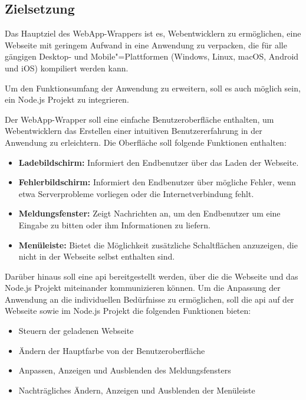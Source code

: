 \subsection{Zielsetzung}

Das Hauptziel des WebApp-Wrappers ist es, Webentwicklern zu ermöglichen, eine Webseite mit geringem Aufwand in eine Anwendung zu verpacken, die für alle gängigen Desktop- und Mobile"=Plattformen (Windows, Linux, macOS, Android und iOS) kompiliert werden kann.

Um den Funktionsumfang der Anwendung zu erweitern, soll es auch möglich sein, ein Node.js Projekt zu integrieren.

Der WebApp-Wrapper soll eine einfache Benutzeroberfläche enthalten, um Webentwicklern das Erstellen einer intuitiven Benutzererfahrung in der Anwendung zu erleichtern.
Die Oberfläche soll folgende Funktionen enthalten:

\begin{itemize}
  \setlength\itemsep{-0.5em}
  \item \textbf{Ladebildschirm:}
  Informiert den Endbenutzer über das Laden der Webseite.
  \item \textbf{Fehlerbildschirm:}
  Informiert den Endbenutzer über mögliche Fehler, wenn etwa Serverprobleme vorliegen oder die Internetverbindung fehlt.
  \item \textbf{Meldungsfenster:}
  Zeigt Nachrichten an, um den Endbenutzer um eine Eingabe zu bitten oder ihm Informationen zu liefern.
  \item \textbf{Menüleiste:}
  Bietet die Möglichkeit zusätzliche Schaltflächen anzuzeigen, die nicht in der Webseite selbst enthalten sind.
\end{itemize}

Darüber hinaus soll eine \ac{api} bereitgestellt werden, über die die Webseite und das Node.js Projekt miteinander kommunizieren können.
Um die Anpassung der Anwendung an die individuellen Bedürfnisse zu ermöglichen, soll die \ac{api} auf der Webseite sowie im Node.js Projekt die folgenden Funktionen bieten:

\begin{itemize}
  \setlength\itemsep{-0.8em}
  \item Steuern der geladenen Webseite
  \item Ändern der Hauptfarbe von der Benutzeroberfläche
  \item Anpassen, Anzeigen und Ausblenden des Meldungsfensters
  \item Nachträgliches Ändern, Anzeigen und Ausblenden der Menüleiste
\end{itemize}
